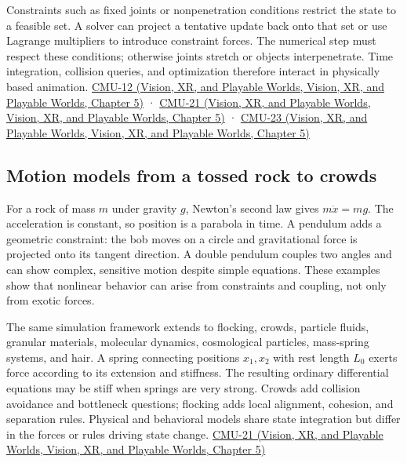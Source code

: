 Constraints such as fixed joints or nonpenetration conditions restrict the state to a feasible set. A solver can project a tentative update back onto that set or use Lagrange multipliers to introduce constraint forces. The numerical step must respect these conditions; otherwise joints stretch or objects interpenetrate. Time integration, collision queries, and optimization therefore interact in physically based animation. \href{../07-Vision-XR-and-Playable-Worlds/main.pdf\#nameddest=04-visual-computing-ii-ch036-cmu-12---geometric-queries}{CMU-12 (Vision, XR, and Playable Worlds, Vision, XR, and Playable Worlds, Chapter 5)} · \href{../07-Vision-XR-and-Playable-Worlds/main.pdf\#nameddest=04-visual-computing-ii-ch036-cmu-21---dynamics-and-time-integration}{CMU-21 (Vision, XR, and Playable Worlds, Vision, XR, and Playable Worlds, Chapter 5)} · \href{../07-Vision-XR-and-Playable-Worlds/main.pdf\#nameddest=04-visual-computing-ii-ch036-cmu-23---physically-based-animation-and-pdes}{CMU-23 (Vision, XR, and Playable Worlds, Vision, XR, and Playable Worlds, Chapter 5)}

\subsection{Motion models from a tossed rock to crowds}\label{04-visual-computing-ii-ch029-motion-models-from-a-tossed-rock-to-crowds}

For a rock of mass \(m\) under gravity \(g\), Newton's second law gives \(m\ddot x=mg\). The acceleration is constant, so position is a parabola in time. A pendulum adds a geometric constraint: the bob moves on a circle and gravitational force is projected onto its tangent direction. A double pendulum couples two angles and can show complex, sensitive motion despite simple equations. These examples show that nonlinear behavior can arise from constraints and coupling, not only from exotic forces.

The same simulation framework extends to flocking, crowds, particle fluids, granular materials, molecular dynamics, cosmological particles, mass-spring systems, and hair. A spring connecting positions \(x_1,x_2\) with rest length \(L_0\) exerts force according to its extension and stiffness. The resulting ordinary differential equations may be stiff when springs are very strong. Crowds add collision avoidance and bottleneck questions; flocking adds local alignment, cohesion, and separation rules. Physical and behavioral models share state integration but differ in the forces or rules driving state change. \href{../07-Vision-XR-and-Playable-Worlds/main.pdf\#nameddest=04-visual-computing-ii-ch036-cmu-21---dynamics-and-time-integration}{CMU-21 (Vision, XR, and Playable Worlds, Vision, XR, and Playable Worlds, Chapter 5)}

